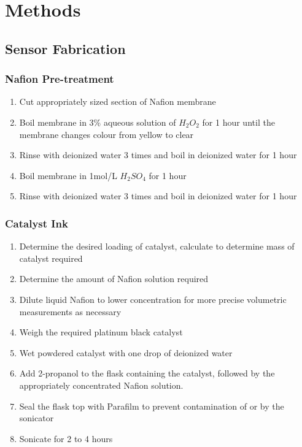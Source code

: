\documentclass{article}
\begin{document}
	\section{Methods}
		\subsection{Sensor Fabrication}
		\subsubsection{Nafion Pre-treatment}
			\begin{enumerate}
			\item Cut appropriately sized section of Nafion membrane
			\item Boil membrane in 3\% aqueous solution of $H_{2}O_{2}$ for 1 hour until the membrane changes colour from yellow to clear
			\item Rinse with deionized water 3 times and boil in deionized water for 1 hour
			\item Boil membrane in 1mol/L $H_{2}SO_{4}$ for 1 hour
			\item Rinse with deionized water 3 times and boil in deionized water for 1 hour
			\end{enumerate}
		\subsubsection{Catalyst Ink}
			\begin{enumerate}
			\item Determine the desired loading of catalyst, calculate to determine mass of catalyst required
			\item Determine the amount of Nafion solution required
			\item Dilute liquid Nafion to lower concentration for more precise volumetric measurements as necessary
			\item Weigh the required platinum black catalyst
			\item Wet powdered catalyst with one drop of deionized water
			\item Add 2-propanol to the flask containing the catalyst, followed by the appropriately concentrated Nafion solution.
			\item Seal the flask top with Parafilm to prevent contamination of or by the sonicator
			\item Sonicate for 2 to 4 hours
			\end{enumerate}
\end{document}
